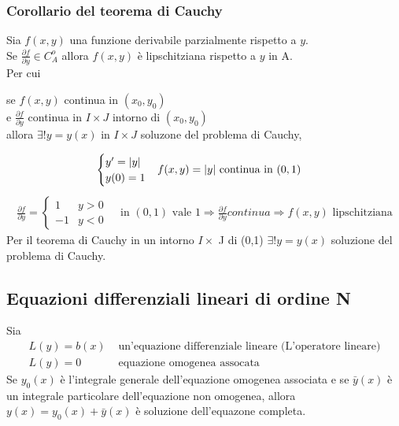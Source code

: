 \subsubsection{Corollario del teorema di Cauchy}
\begin{defi}
  Sia $f(x,y)$ una funzione derivabile parzialmente rispetto a $y$.\\
  Se $\frac{\partial f}{\partial y}\in C_A^o$ allora $f(x,y)$ è lipschitziana rispetto a
  $y$ in A.\\
  Per cui
  \begin{center}
    se $f(x,y)$ continua in $(x_0,y_0)$\\
    e $\frac{\partial f}{\partial y}$ continua in $I\times J$ intorno di $(x_0,y_0)$\\
    allora $\exists! y=y(x)$ in $I\times J$ soluzone del problema di Cauchy,
  \end{center}
\end{defi}
\begin{esempio}
  \begin{eqnarray*}
    \begin{cases}
      y^\prime=\lvert y\rvert\\
      y(0)=1
    \end{cases} & f(x,y)=\lvert y\rvert \text{ continua in }(0,1)
  \end{eqnarray*}
  \begin{eqnarray*}
    \frac{\partial f}{\partial y}=\begin{cases}
                                    1 & y>0\\
                                    -1 & y<0
                                  \end{cases}
    & \text{ in } (0,1) \text{ vale } 1 \Rightarrow \frac{\partial f}{\partial y}
      continua \Rightarrow f(x,y)\text{ lipschitziana}
  \end{eqnarray*}
  Per il teorema di Cauchy in un intorno $I\times$ J di (0,1) $\exists! y=y(x)$ soluzione
  del problema di Cauchy.
\end{esempio}
\subsection{Equazioni differenziali lineari di ordine N}
Sia
\begin{align*}
  L(y)=b(x) & \text{ un'equazione differenziale lineare (L'operatore lineare)} \\
  L(y)=0 & \text{ equazione omogenea assocata}
\end{align*}
Se $y_0(x)$ è l'integrale generale dell'equazione omogenea associata e se $\bar{y}(x)$ è
un integrale particolare dell'equazione non omogenea, allora $y(x)=y_0(x)+\bar{y}(x)$ è
soluzione dell'equazone completa.
